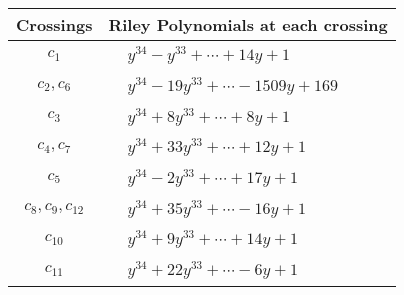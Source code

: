 \documentclass[1p]{elsarticle_modified}
\theoremstyle{definition}
\begin{document}
\begin{tabular}{m{50pt}|m{274pt}}
Crossings & \hspace{64pt}Riley Polynomials at each crossing \\
\hline $$\begin{aligned}c_{1}\end{aligned}$$&$\begin{aligned}
&y^{34}- y^{33}+\cdots+14 y+1
\end{aligned}$\\
\hline $$\begin{aligned}c_{2},c_{6}\end{aligned}$$&$\begin{aligned}
&y^{34}-19 y^{33}+\cdots-1509 y+169
\end{aligned}$\\
\hline $$\begin{aligned}c_{3}\end{aligned}$$&$\begin{aligned}
&y^{34}+8 y^{33}+\cdots+8 y+1
\end{aligned}$\\
\hline $$\begin{aligned}c_{4},c_{7}\end{aligned}$$&$\begin{aligned}
&y^{34}+33 y^{33}+\cdots+12 y+1
\end{aligned}$\\
\hline $$\begin{aligned}c_{5}\end{aligned}$$&$\begin{aligned}
&y^{34}-2 y^{33}+\cdots+17 y+1
\end{aligned}$\\
\hline $$\begin{aligned}c_{8},c_{9},c_{12}\end{aligned}$$&$\begin{aligned}
&y^{34}+35 y^{33}+\cdots-16 y+1
\end{aligned}$\\
\hline $$\begin{aligned}c_{10}\end{aligned}$$&$\begin{aligned}
&y^{34}+9 y^{33}+\cdots+14 y+1
\end{aligned}$\\
\hline $$\begin{aligned}c_{11}\end{aligned}$$&$\begin{aligned}
&y^{34}+22 y^{33}+\cdots-6 y+1
\end{aligned}$\\
\hline
\end{tabular}\\~\\
\end{document}
